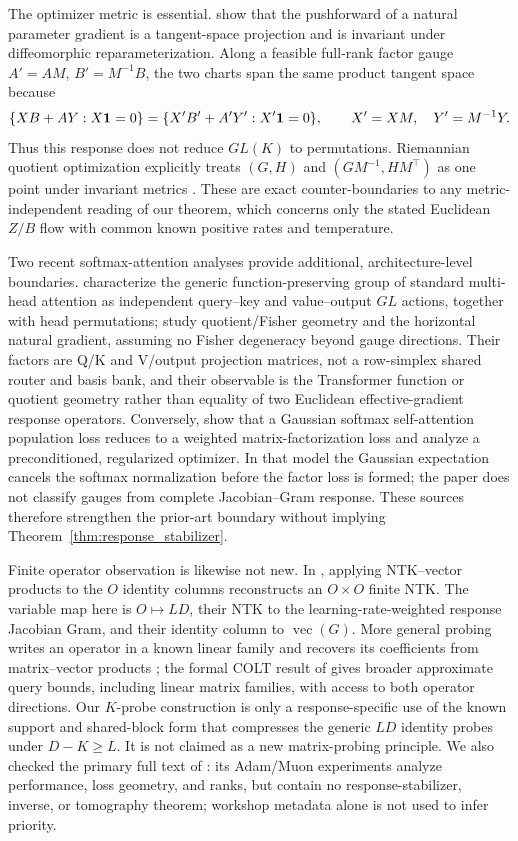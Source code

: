 The optimizer metric is essential.  \citet[Thms.~1--2]{vanoostrum2023invariance}
show that the pushforward of a natural parameter gradient is a tangent-space
projection and is invariant under diffeomorphic reparameterization.  Along a
feasible full-rank factor gauge $A'=AM$, $B'=M^{-1}B$, the two charts span the
same product tangent space because
\[
 \{XB+AY:X\mathbf{1}=0\}
 =\{X'B'+A'Y':X'\mathbf{1}=0\},
 \qquad X'=XM,\quad Y'=M^{-1}Y.
\]
Thus this response does not reduce $GL(K)$ to
permutations.  Riemannian quotient optimization explicitly treats
$(G,H)$ and $(GM^{-1},HM^\top)$ as one point under invariant metrics
\citep{mishra2014fixedrank}.  These are exact counter-boundaries to any
metric-independent reading of our theorem, which concerns only the stated
Euclidean $Z/B$ flow with common known positive rates and temperature.

Two recent softmax-attention analyses provide additional, architecture-level
boundaries.  \citet{wang2025complete} characterize the generic
function-preserving group of standard multi-head attention as independent
query--key and value--output $GL$ actions, together with head permutations;
\citet{wang2025gaugefiber} study quotient/Fisher geometry and the horizontal
natural gradient, assuming no Fisher degeneracy beyond gauge directions.
Their factors are Q/K and V/output projection
matrices, not a row-simplex shared router and basis bank, and their observable
is the Transformer function or quotient geometry rather than equality of two
Euclidean effective-gradient response operators.  Conversely,
\citet{goel2026training} show that a Gaussian softmax self-attention population
loss reduces to a weighted matrix-factorization loss and analyze a
preconditioned, regularized optimizer.  In that model the Gaussian expectation
cancels the softmax normalization before the factor loss is formed; the paper
does not classify gauges from complete Jacobian--Gram response.  These sources
therefore strengthen the prior-art boundary without implying
Theorem~\ref{thm:response_stabilizer}.

Finite operator observation is likewise not new.  In
\citet[Sec.~3.3, Eqs.~(7)--(9)]{novak2022fast}, applying NTK--vector products
to the $O$ identity columns reconstructs an $O\times O$ finite NTK.  The
variable map here is $O\mapsto LD$, their NTK to the learning-rate-weighted
response Jacobian Gram, and their identity column to $\operatorname{vec}(G)$.
More general probing writes an operator in a known linear family and recovers
its coefficients from matrix--vector products
\citep{chiu2012matrix,halikias2024structured,otto2023recovering}; the formal
COLT result of \citet{amsel2026query} gives broader approximate query bounds,
including linear matrix families, with access to both operator directions.
Our $K$-probe construction is only a response-specific use of the known
support and shared-block form that compresses the generic $LD$ identity
probes under $D-K\ge L$.  It is not claimed as a new matrix-probing
principle.  We also checked the primary full text of
\citet{stupariu2026optimizer}: its Adam/Muon experiments analyze performance,
loss geometry, and ranks, but contain no response-stabilizer, inverse, or
tomography theorem; workshop metadata alone is not used to infer priority.

